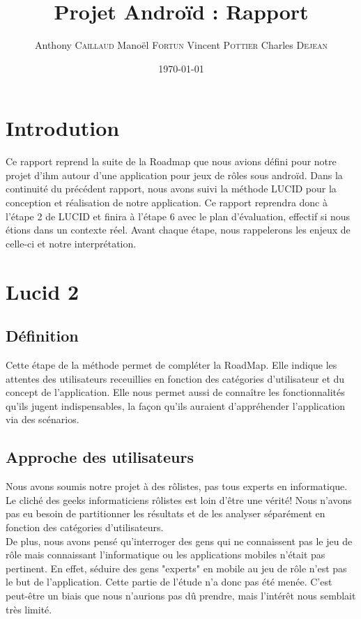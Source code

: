 \documentclass[11pt,a4paper]{article}
\title{Projet Androïd : Rapport}
\author{Anthony \textsc{Caillaud} Manoël \textsc{Fortun} Vincent
\textsc{Pottier} Charles \textsc{Dejean}}
\date{\today}
\begin{document}
\maketitle

\clearpage \tableofcontents \clearpage
\section{Introdution}

Ce rapport reprend la suite de la Roadmap que nous avions défini pour notre
projet d'ihm autour d'une application pour jeux de rôles sous androïd. Dans la
continuité du précédent rapport, nous avons suivi la méthode LUCID pour la
conception et réalisation de notre application. Ce rapport reprendra donc à
l'étape 2 de LUCID et finira à l'étape 6 avec le plan d'évaluation, effectif si
nous étions dans un contexte réel. Avant chaque étape, nous rappelerons les
enjeux de celle-ci et notre interprétation.

\clearpage

\section{Lucid 2}

\subsection{Définition}

Cette étape de la méthode permet de compléter la RoadMap. Elle indique les
attentes des utilisateurs receuillies en fonction des catégories d'utilisateur
et du concept de l'application. Elle nous permet aussi de connaître les
fonctionnalités qu'ils jugent indispensables, la façon qu'ils auraient
d'appréhender l'application via des scénarios.

\subsection{Approche des utilisateurs}

Nous avons soumis notre projet à des rôlistes, pas tous experts en
informatique. Le cliché des geeks informaticiens rôlistes est loin d'être une
vérité! Nous n'avons pas eu besoin de partitionner les résultats et de
les analyser séparément en fonction des catégories d'utilisateurs.\\

De plus, nous avons pensé qu'interroger des gens qui ne connaissent pas le jeu
de rôle mais connaissant l'informatique ou les applications mobiles n'était pas
pertinent. En effet, séduire des gens "experts" en mobile au jeu de rôle n'est
pas le but de l'application. Cette partie de l'étude n'a donc pas été menée.
C'est peut-être un biais que nous n'aurions pas dû prendre, mais l'intérêt nous
semblait très limité.\\
\end{document}
